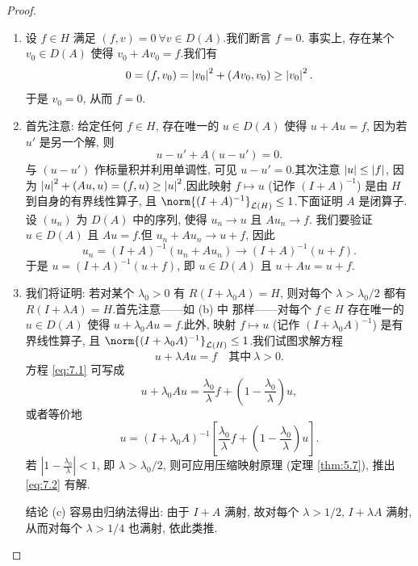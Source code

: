 \begin{proof}
\begin{enumerate}[label=(\alph*), leftmargin=2.2em, itemsep=0.3em]
	\item 设 $f\in H$ 满足 $(f,v)=0\ \forall v\in D(A)$.我们断言 $f=0$.
	      事实上, 存在某个 $v_0\in D(A)$ 使得 $v_0+Av_0=f$.我们有
	      \begin{equation*}
	      0=(f,v_0)=\left|v_0\right|^2+(Av_0,v_0)\ge\left|v_0\right|^2.
	      \end{equation*}
	      于是 $v_0=0$, 从而 $f=0$.
	\item 首先注意: 给定任何 $f\in H$, 存在唯一的 $u\in D(A)$ 使得
	      $u+Au=f$, 因为若 $u'$ 是另一个解, 则
	      \begin{equation*}
	      u-u'+A(u-u')=0.
	      \end{equation*}
	      与 $(u-u')$ 作标量积并利用单调性, 可见 $u-u'=0$.其次注意
	      $\left|u\right|\le\left|f\right|$, 因为
	      $\left|u\right|^2+(Au,u)=(f,u)\ge\left|u\right|^2$.因此映射 $f\mapsto u$
	      (记作 $(I+A)^{-1}$) 是由 $H$ 到自身的有界线性算子, 且
	      $\norm{(I+A)^{-1}}_{\LL(H)}\le1$.下面证明 $A$ 是闭算子.设
	      $(u_n)$ 为 $D(A)$ 中的序列, 使得 $u_n\to u$ 且 $Au_n\to f$.
	      我们要验证 $u\in D(A)$ 且 $Au=f$.但 $u_n+Au_n\to u+f$, 因此
	      \begin{equation*}
	      u_n=(I+A)^{-1}(u_n+Au_n)\to(I+A)^{-1}(u+f).
	      \end{equation*}
	      于是 $u=(I+A)^{-1}(u+f)$, 即 $u\in D(A)$ 且 $u+Au=u+f$.
	\item 我们将证明: 若对某个 $\lambda_0>0$ 有 $R(I+\lambda_0A)=H$, 则对每个
	      $\lambda>\lambda_0/2$ 都有 $R(I+\lambda A)=H$.首先注意——如 (b) 中
	      那样——对每个 $f\in H$ 存在唯一的 $u\in D(A)$ 使得
	      $u+\lambda_0Au=f$.此外, 映射 $f\mapsto u$ (记作
	      $(I+\lambda_0A)^{-1}$) 是有界线性算子, 且
	      $\norm{(I+\lambda_0A)^{-1}}_{\LL(H)}\le1$.我们试图求解方程
	      \begin{equation}
	      u+\lambda Au=f\quad\text{其中}\ \lambda>0.
	      \label{eq:7.1}
	      \end{equation}
	      方程 \eqref{eq:7.1} 可写成
	      \begin{equation*}
	      u+\lambda_0Au=\frac{\lambda_0}{\lambda}f
	      +\left(1-\frac{\lambda_0}{\lambda}\right)u,
	      \end{equation*}
	      或者等价地
	      \begin{equation}
	      u=(I+\lambda_0A)^{-1}
	      \left[\frac{\lambda_0}{\lambda}f
	      +\left(1-\frac{\lambda_0}{\lambda}\right)u\right].
	      \label{eq:7.2}
	      \end{equation}
	      若 $\left|1-\frac{\lambda_0}{\lambda}\right|<1$, 即
	      $\lambda>\lambda_0/2$, 则可应用压缩映射原理 (定理  \ref{thm:5.7}),
	      推出 \eqref{eq:7.2} 有解.

	      结论 (c) 容易由归纳法得出: 由于 $I+A$ 满射, 故对每个
	      $\lambda>1/2$, $I+\lambda A$ 满射, 从而对每个 $\lambda>1/4$
	      也满射, 依此类推.
\end{enumerate}
\end{proof}

